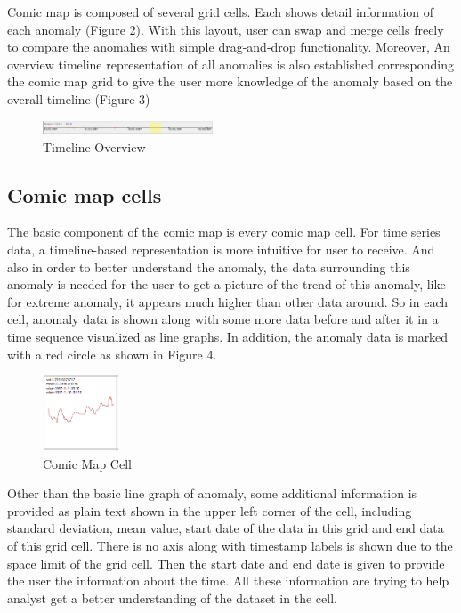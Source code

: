 \documentclass{vgtc}                          %
\begin{document}
Comic map is composed of several grid cells. Each shows detail information of each anomaly (Figure 2). With this layout, user can swap and merge cells freely to compare the anomalies with simple drag-and-drop functionality. Moreover, An overview timeline representation of all anomalies is also established corresponding the comic map grid to give the user more knowledge of the anomaly based on the overall timeline (Figure 3)

 \begin{figure}[htb]
	\centering
  \includegraphics[width=0.45\textwidth]{timeline.png}
  \caption{Timeline Overview}
\end{figure}

\subsection{Comic map cells}

The basic component of the comic map is every comic map cell. For time series data, a timeline-based representation is more intuitive for user to receive. And also in order to better understand the anomaly, the data surrounding this anomaly is needed for the user to get a picture of the trend of this anomaly, like for extreme anomaly, it appears much higher than other data around. So in each cell, anomaly data is shown along with some more data before and after it in a time sequence visualized as line graphs. In addition, the anomaly data is marked with a red circle as shown in Figure 4. 

 \begin{figure}[htb]
	\centering
  \includegraphics[width=0.20\textwidth]{onecell.jpg}
  \caption{Comic Map Cell}
\end{figure}

Other than the basic line graph of anomaly, some additional information is provided as plain text shown in the upper left corner of the cell, including standard deviation, mean value, start date of the data in this grid and end data of this grid cell. There is no axis along with timestamp labels is shown due to the space limit of the grid cell. Then the start date and end date is given to provide the user the information about the time. All these information are trying to help analyst get a better understanding of the dataset in the cell.
\end{document}
